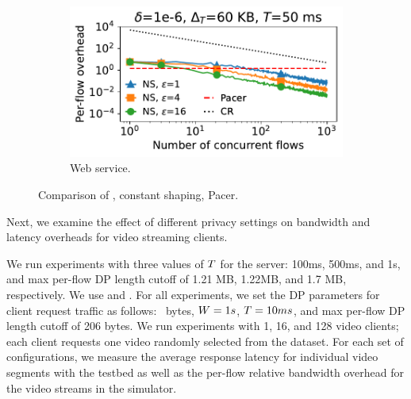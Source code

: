 \begin{figure}[t]
\begin{subfigure}{0.49\columnwidth}
      \includegraphics[width=\textwidth]{overhead_vs_number_of_traces_web_bidirectional_loglog_updated.pdf}
      \caption{Web service.}
      \label{fig:web-overheads-compare}
  \end{subfigure}
  \caption{Comparison of {\sys}, constant shaping, Pacer.}
  \vspace{-0.4cm}
\end{figure}
Next, we examine the effect of different privacy settings on bandwidth and
latency overheads for video streaming clients.

We run experiments with three values of $T$
for the server: 100ms, 500ms, and 1s, and max per-flow DP length cutoff of
1.21 MB, 1.22MB, and 1.7 MB, respectively. We use
 and
.
For all experiments, we set the DP parameters for client request traffic as
follows: ~bytes, $W = 1s$, $T = 10ms$,
 and max per-flow DP length cutoff of 206 bytes.
We run experiments with 1, 16, and 128 video
clients; each client requests one video randomly selected from the dataset.
For each set of configurations, we measure the average response latency for
individual video segments with the testbed as well as the per-flow relative
bandwidth overhead for the video streams in the simulator.

